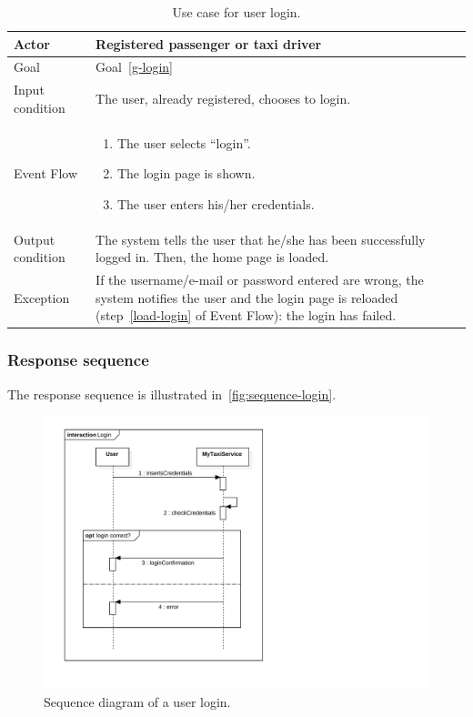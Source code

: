 \begin{table}
\begin{center}
\begin{tabular}{| l | p{} |}
\hline
Actor & Registered passenger or taxi driver \\
\hline
Goal & Goal~\ref{g-login}
\\
\hline
Input condition & The user, already registered, chooses to login.  \\
\hline
Event Flow & \begin{enumerate}
	\item The user selects ``login''.
	\item The login page is shown. \label{load-login}
	\item The user enters his/her credentials.
	\end{enumerate}
\\
\hline
Output condition & The system tells the user that he/she has been successfully logged in.
Then, the home page is loaded. \\
\hline

Exception & If the username/e-mail or password entered are wrong, the system notifies the user and the login page is reloaded (step~\ref{load-login} of Event Flow): the login has failed.
 \\
\hline
\end{tabular}
\end{center}
\caption{Use case for user login.}
\label{usecase-login}
\end{table}

\subsubsection{Response sequence}
The response sequence is illustrated in~\autoref{fig:sequence-login}.
\begin{figure}
\includegraphics[width=\textwidth]{diagrams/sequence_login.pdf}
\caption{Sequence diagram of a user login.}
\label{fig:sequence-login}
\end{figure}

